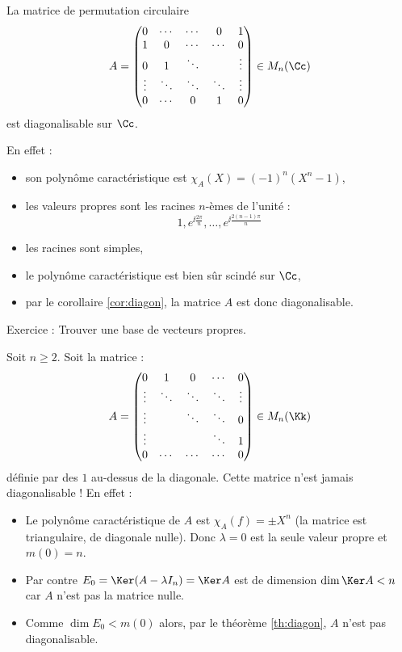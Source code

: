 \documentclass[12pt, class=report,crop=false]{standalone}
\begin{document}
\begin{exemple}
La matrice de permutation circulaire 
\[A =
\begin{pmatrix}
0&\cdots&\cdots&0&1\\
1&0&\cdots&\cdots&0\\
0&1&\ddots&&\vdots\\
\vdots&\ddots&\ddots&\ddots&\vdots\\
0&\cdots&0&1&0
\end{pmatrix}
\in M_n(\Cc)\] 
est diagonalisable sur $\Cc$.

En effet :
\begin{itemize}
  \item son polynôme caractéristique est $\chi_A(X) = (-1)^n(X^n-1)$,
  
      
  \item les valeurs propres sont les racines $n$-èmes de l'unité :
  \[1,e^{\ii\frac{2\pi}{n}},\ldots,e^{\ii\frac{2(n-1)\pi}{n}}\]
  
  \item les racines sont simples,  
  
  \item le polynôme caractéristique est bien sûr scindé sur $\Cc$,
  
  \item par le corollaire \ref{cor:diagon}, la matrice $A$ est donc diagonalisable.
\end{itemize}

Exercice : Trouver une base de vecteurs propres.
\end{exemple}





\begin{exemple}
Soit $n \ge 2$. Soit la matrice :
\[A = 
\begin{pmatrix}
0&1&0&\cdots&0\\
\vdots&\ddots&\ddots&\ddots&\vdots\\
\vdots&&\ddots&\ddots&0\\
\vdots&& &\ddots&1\\
0&\cdots&\cdots&\cdots&0
\end{pmatrix} \in M_n(\Kk)
\]
définie par des $1$ au-dessus de la diagonale.
Cette matrice n'est jamais diagonalisable !
En effet :
\begin{itemize}
  \item Le polynôme caractéristique de $A$ est $\chi_A(f) = \pm X^n$ (la matrice est triangulaire, de diagonale nulle).
  Donc $\lambda = 0$ est la seule valeur propre et $m(0) = n$.
  \item Par contre $E_0 = \Ker (A -\lambda I_n) = \Ker A$ est de dimension $\dim \Ker A < n$ car $A$ n'est pas la matrice nulle.
  \item Comme $\dim E_0 < m(0)$ alors, par le théorème \ref{th:diagon}, $A$ n'est pas diagonalisable.
\end{itemize}
\end{exemple}
\end{document}
